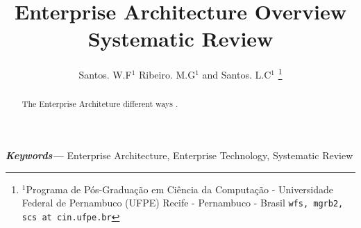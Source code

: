 \documentclass[a4paper, 10 pt, conference]{ieeeconf}
\title{\LARGE \bf
Enterprise Architecture Overview Systematic Review
}
\author{Santos. W.F$^{1}$ Ribeiro. M.G$^{1}$ and Santos. L.C$^{1}$%
\thanks{$^{1}$Programa de Pós-Graduação em Ciência da Computação - Universidade Federal de Pernambuco (UFPE)
Recife - Pernambuco - Brasil
        {\tt\small {wfs, mgrb2, scs} at cin.ufpe.br}}%
}
\providecommand{\palavrasChaves}[1]
{
  \small
  \textbf{\textit{Keywords---}} #1
}
\begin{document}
\maketitle
\thispagestyle{empty}
\pagestyle{empty}


\begin{abstract}
The Enterprise Architeture different ways .
\end{abstract}

\palavrasChaves{Enterprise Architecture, Enterprise Technology, Systematic Review}


\end{document}
